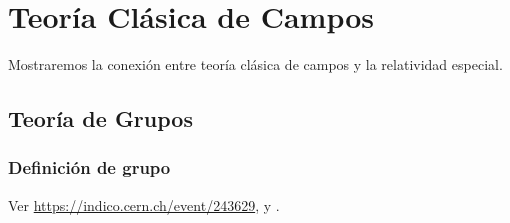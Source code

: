 \chapter{Teoría Clásica de Campos}
\label{chap:tcc} %
Mostraremos la conexión entre teoría clásica de campos y la relatividad
especial.  


\section{Teoría de Grupos}

\subsection{Definición de grupo}
Ver \url{https://indico.cern.ch/event/243629}, \cite{salcedofisica} y \cite{Zee:2016fuk}.




